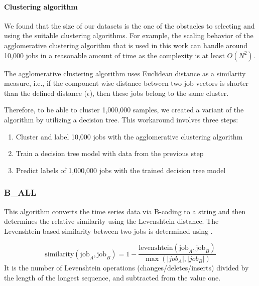 \documentclass{jhps}
\makeatletter
\newcommand{\jk}[1]{\todo[inline]{JK:\@#1}}
\makeatother
\begin{document}
\paragraph{Clustering algorithm}
We found that the size of our datasets is the one of the obstacles to selecting and using the suitable clustering algorithms.
For example, the scaling behavior of the agglomerative clustering algorithm that is used in this work can handle around 10,000 jobs in a reasonable amount of time as the complexity is at least $O(N^{2})$.

The agglomerative clustering algorithm uses Euclidean distance as a similarity measure, i.e., if the component wise distance between two job vectors is shorter than the defined distance ($\epsilon$), then these jobs belong to the same cluster.

Therefore, to be able to cluster 1,000,000 samples, we created a variant of the algorithm by utilizing a decision tree.
This workaround involves three steps:

\begin{enumerate}
 \item Cluster and label 10,000 jobs with the agglomerative clustering algorithm
 \item Train a decision tree model with data from the previous step
 \item Predict labels of 1,000,000 jobs with the trained decision tree model
\end{enumerate}

\subsubsection{B\_ALL}
This algorithm converts the time series data via B-coding to a string and then determines the relative similarity using the Levenshtein distance.
The Levenshtein based similarity between two jobs is determined using .

\begin{equation}
	\text{similarity}\left(\text{job}_{A},\text{job}_{B} \right) = 1 - \frac{\text{levenshtein}\left(\text{job}_{A},\text{job}_{B} \right) }{\max \left(|job_{A}|,|job_{B}| \right) } \label{eq:sim:bin_all}
\end{equation}
It is the number of Levenshtein operations (changes/deletes/inserts) divided by the length of the longest sequence, and subtracted from the value one.

\end{document}
